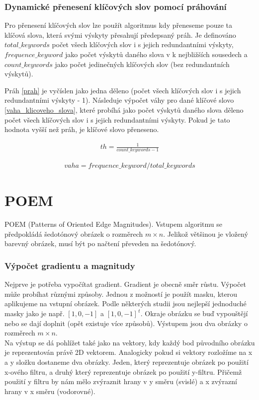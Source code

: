 \documentclass[czech,BP]{thesiskiv}
\begin{document}
\subsection{Dynamické přenesení klíčových slov pomocí práhování}
\par Pro přenesení klíčových slov lze použít algoritmus kdy přeneseme pouze ta klíčová slova, která svými výskyty přesahují předepsaný práh. Je definováno $total\_keywords$ počet všech klíčových slov i s jejich redundantními výskyty, $frequence\_keyword$ jako počet výskytů daného slova v k nejbližších sousedech a $count\_keywords$ jako počet jedinečných klíčových slov (bez redundantních výskytů).  

\par Práh \eqref{prah} je vyčíslen jako jedna děleno (počet všech klíčových slov i s jejich redundantními výskyty - 1). Následuje výpočet váhy pro dané klíčové slovo \eqref{vaha_klicoveho_slova}, které probíhá jako počet výskytů daného slova děleno počet všech klíčových slov i s jejich redundantními výskyty. Pokud je tato hodnota vyšší než práh, je klíčové slovo přeneseno.

\begin{align}
   \label{prah} th = \frac{1}{count\_keywords-1}
\end{align}

\begin{align}
   \label{vaha_klicoveho_slova} vaha = frequence\_keyword / total\_keywords
\end{align} 
 
\chapter{POEM}
POEM (Patterns of Oriented Edge Magnitudes). Vstupem algoritmu se předpokládá šedotónový obrázek o rozměrech  $m \times n$. Jelikož většinou je vložený barevný obrázek, musí být po načtení převeden na šedotónový. \cite{SrovnaniDeskriptoru}

\subsection{Výpočet gradientu a magnitudy}
Nejprve je potřeba vypočítat gradient. Gradient je obecně směr růstu. Výpočet může probíhat různými způsoby. Jednou z možností je použít masku, kterou aplikujeme na vstupní obrázek. Podle některých studii jsou nejlepší jednoduché masky jako je např. $[1, 0, -1]$ a $[1, 0, -1]^{\,t}$. Okraje obrázku se buď vypouštějí nebo se dají doplnit (opět existuje více způsobů). Výstupem jsou dva obrázky o rozměrech $m \times n$. \\
Na výstup se dá pohlížet také jako na vektory, kdy každý bod původního obrázku je reprezentován právě 2D vektorem. Analogicky pokud si vektory rozložíme na x a y složku dostaneme dva obrázky. Jeden, který reprezentuje obrázek po použití x-ového filtru, a druhý který reprezentuje obrázek po použití y-filtru. Přičemž použití y filtru by nám mělo zvýraznit hrany v y směru (svislé) a x zvýrazní hrany v x směru (vodorovné). \\
\end{document}

